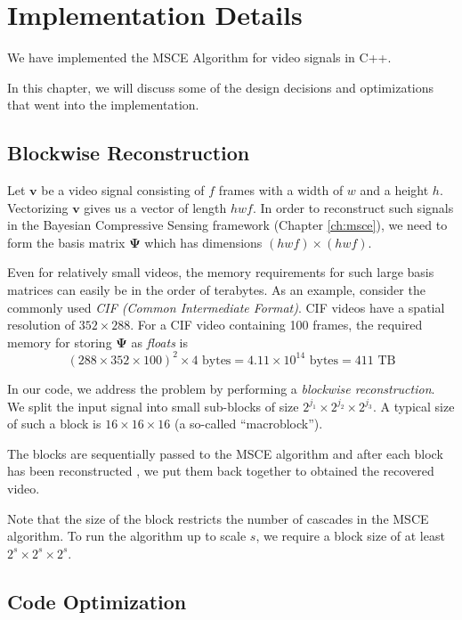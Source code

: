 \chapter{Implementation Details}
\label{ch:code}
We have implemented the MSCE Algorithm for video signals in C++.

In this chapter, we will discuss some of the design decisions and optimizations that went into the implementation.

\section{Blockwise Reconstruction}
Let $\bm v$ be a video signal consisting of $f$ frames with a width of $w$ and a height $h$.
Vectorizing $\bm v$ gives us a vector of length $hwf$.
In order to reconstruct such signals in the Bayesian Compressive Sensing framework (Chapter \ref{ch:msce}), we need to form the basis matrix $\bm\Psi$ which has dimensions $(hwf)\times (hwf)$.

Even for relatively small videos, the memory requirements for such large basis matrices can easily be in the order of terabytes.
As an example, consider the commonly used \emph{CIF (Common Intermediate Format)}.
CIF videos have a spatial resolution of $352 \times 288$.
For a CIF video containing 100 frames, the required memory for storing $\bm\Psi$ as \emph{floats} is 
\begin{equation*}
(288\times 352\times 100)^2 \times 4 \mbox{ bytes} = 4.11 \times 10^{14} \mbox{ bytes} = 411 \mbox{ TB}
\end{equation*}

In our code, we address the problem by performing a \emph{blockwise reconstruction}.
We split the input signal into small sub-blocks of size $2^{j_1}\times 2^{j_2}\times 2^{j_3}$.
A typical size of such a block is $16\times 16\times 16$ (a so-called ``macroblock'').

The blocks are sequentially passed to the MSCE algorithm and after each block has been reconstructed , we put them back together to obtained the recovered video.

Note that the size of the block restricts the number of cascades in the MSCE algorithm.
To run the algorithm up to scale $s$, we require a block size of at least $2^s\times 2^s\times 2^s$.

\section{Code Optimization}
